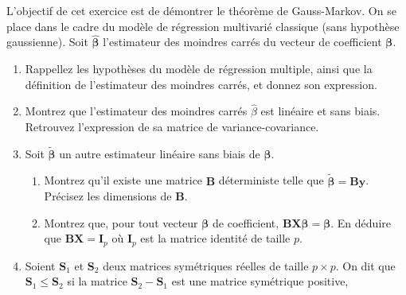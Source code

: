 \documentclass{../headers/td_upc}
\providecommand{\1}{\mathds{1}}
\begin{document}
	  L'objectif de cet exercice est de démontrer le 
	théorème de Gauss-Markov. On se place dans le cadre du modèle de régression multivarié
	classique (sans hypothèse gaussienne). Soit $\hat{\boldsymbol{\beta}}$ l'estimateur des moindres carrés
	du vecteur de coefficient $\boldsymbol{\beta}$. 
	\begin{enumerate}
		\item Rappellez les hypothèses du modèle de régression multiple, ainsi que la définition 
		de l'estimateur des moindres carrés, et donnez son expression.
		\item Montrez que l'estimateur des moindres carrés $\hat \beta$ est linéaire et sans biais.
		Retrouvez l'expression de sa matrice de variance-covariance.
		\item Soit $\tilde{\boldsymbol{\beta}}$ un autre estimateur linéaire sans biais de $\boldsymbol{\beta}$.
		\begin{enumerate}
			\item Montrez qu'il existe une matrice $\mathbf{B}$ déterministe telle que $\tilde{\boldsymbol{\beta}} = \mathbf{B}\mathbf{y}$.
			Précisez les dimensions de $\mathbf{B}$.
			\item Montrez que, pour tout vecteur $\boldsymbol{\beta}$ de coefficient,
			$\mathbf{B} \mathbf{X} \boldsymbol{\beta} = \boldsymbol{\beta}$.
			En déduire que $\mathbf{B} \mathbf{X} = \mathbf{I}_p$ où $\mathbf{I}_p$ 
			est la matrice identité de taille $p$.
		\end{enumerate}
		\item Soient $\mathbf{S}_1$ et $\mathbf{S}_2$ deux matrices symétriques réelles
		de taille $p \times p$.
		On dit que $\mathbf{S}_1 \leq \mathbf{S}_2$ si la matrice 
		$\mathbf{S}_2 - \mathbf{S}_1$ est une matrice symétrique positive,

\end{enumerate}
\end{document}
